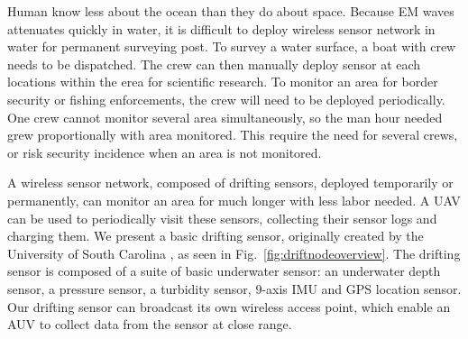Human know less about the ocean than they do about space.
Because EM waves attenuates quickly in water, it is difficult to deploy wireless sensor network in water for permanent surveying post.
To survey a water surface, a boat with crew needs to be dispatched.
The crew can then manually deploy sensor at each locations within the erea for scientific research.
To monitor an area for border security or fishing enforcements, the crew will need to be deployed periodically.
One crew cannot monitor several area simultaneously, so the man hour needed grew proportionally with area monitored.
This require the need for several crews, or risk security incidence when an area is not monitored.

A wireless sensor network, composed of drifting sensors, deployed temporarily or permanently, can monitor an area for much longer with less labor needed.
A UAV can be used to periodically visit these sensors, collecting their sensor logs and charging them.
We present a basic drifting sensor, originally created by the University of South Carolina \cite{drifterUSC}, as seen in Fig.~\ref{fig:driftnodeoverview}.
The drifting sensor is composed of a suite of basic underwater sensor: an underwater depth sensor, a pressure sensor, a turbidity sensor, 9-axis IMU and GPS location sensor.
Our drifting sensor can broadcast its own wireless access point, which enable an AUV to collect data from the sensor at close range.
